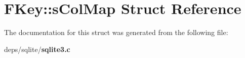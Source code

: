 \section{FKey::s\-Col\-Map Struct Reference}
\label{structFKey_1_1sColMap}


The documentation for this struct was generated from the following file:\begin{CompactItemize}
\item 
deps/sqlite/\bf{sqlite3.c}\end{CompactItemize}
